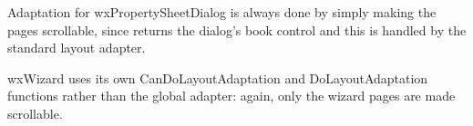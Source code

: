
Adaptation for wxPropertySheetDialog is always done by simply making the pages scrollable, since  returns
the dialog's book control and this is handled by the standard layout adapter.

wxWizard uses its own CanDoLayoutAdaptation and DoLayoutAdaptation functions rather than the global adapter: again, only the wizard pages are made scrollable.

